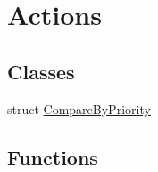 \hypertarget{group___actions}{}\section{Actions}
\label{group___actions}
\subsection*{Classes}
\begin{DoxyCompactItemize}
\item 
struct \mbox{\hyperlink{struct_compare_by_priority}{Compare\+By\+Priority}}
\end{DoxyCompactItemize}
\subsection*{Functions}
